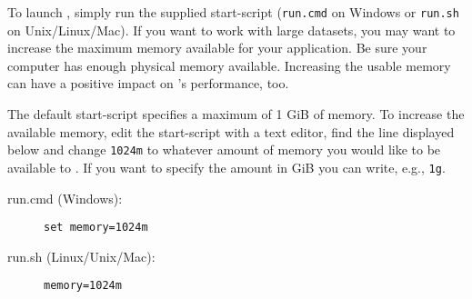 \label{sec:starting_sh}
To launch \sh, simply run the supplied start-script (\texttt{run.cmd} on Windows or \texttt{run.sh} on Unix/Linux/Mac).
If you want to work with large datasets, you may want to increase the maximum memory available for your application.
Be sure your computer has enough physical memory available.
Increasing the usable memory can have a positive impact on \sh's performance, too.

The default start-script specifies a maximum of 1 GiB of memory.
To increase the available memory, edit the start-script with a text editor,
find the line displayed below and change \texttt{1024m} to whatever amount of memory you would like to be available to \sh.
If you want to specify the amount in GiB you can write, e.g., \texttt{1g}.

\begin{description}
 \item[run.cmd (Windows):] \texttt{set memory=1024m}
 \item[run.sh (Linux/Unix/Mac):] \texttt{memory=1024m}
\end{description}

